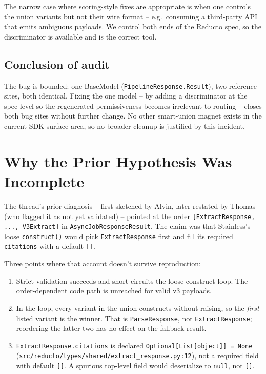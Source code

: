 \documentclass[11pt]{article}
\begin{document}
The narrow case where scoring-style fixes are appropriate is when one controls the union variants but not their wire format -- e.g.\ consuming a third-party API that emits ambiguous payloads. We control both ends of the Reducto spec, so the discriminator is available and is the correct tool.

\subsection{Conclusion of audit}

The bug is bounded: one BaseModel (\texttt{PipelineResponse.Result}), two reference sites, both identical. Fixing the one model -- by adding a discriminator at the spec level so the regenerated permissiveness becomes irrelevant to routing -- closes both bug sites without further change. No other smart-union magnet exists in the current SDK surface area, so no broader cleanup is justified by this incident.

\section{Why the Prior Hypothesis Was Incomplete}

The thread's prior diagnosis -- first sketched by Alvin, later restated by Thomas (who flagged it as not yet validated) -- pointed at the order \texttt{[ExtractResponse, ..., V3Extract]} in \texttt{AsyncJobResponseResult}. The claim was that Stainless's loose \texttt{construct()} would pick \texttt{ExtractResponse} first and fill its required \texttt{citations} with a default \texttt{[]}.

Three points where that account doesn't survive reproduction:
\begin{enumerate}
  \item Strict validation succeeds and short-circuits the loose-construct loop. The order-dependent code path is unreached for valid v3 payloads.
  \item In the loop, every variant in the union constructs without raising, so the \emph{first} listed variant is the winner. That is \texttt{ParseResponse}, not \texttt{ExtractResponse}; reordering the latter two has no effect on the fallback result.
  \item \texttt{ExtractResponse.citations} is declared \texttt{Optional[List[object]] = None} (\texttt{src/reducto/types/shared/extract\_response.py:12}), not a required field with default \texttt{[]}. A spurious top-level field would deserialize to \texttt{null}, not \texttt{[]}.
\end{enumerate}
\end{document}
